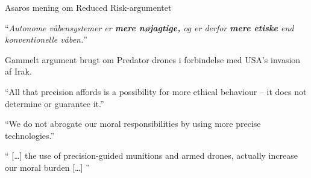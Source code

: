   \begin{frame}{Asaros mening om Reduced Risk-argumentet}

      \enquote{\textit{Autonome våbensystemer er \textbf{mere nøjagtige,}
          og er derfor \textbf{mere etiske} end konventionelle våben.}}%

        \begin{description}

            \pause

            \item[{\citep[s. 702, afsnit 3]{asaro}} ]  Gammelt argument brugt om Predator
                drones i forbindelse med USA's invasion af Irak.

            \pause

            \item[{\citep[s. 702, afsnit 4]{asaro}} ]  \enquote{All that
                    precision affords is a possibility for more ethical
                behaviour -- it does not determine or guarantee it.}

            \pause

            \item[{\citep[s. 703, afsnit 1]{asaro}} ]  \enquote{We do not
                    abrogate our moral responsibilities by using more precise
                technologies.}

            \pause

            \item[{\citep[s. 703, afsnit 1]{asaro}} ]  \enquote{
                    [\ldots] the use of precision-guided munitions and armed drones,
                    actually increase our moral burden [\ldots]
                }

        \end{description}


  \end{frame}

